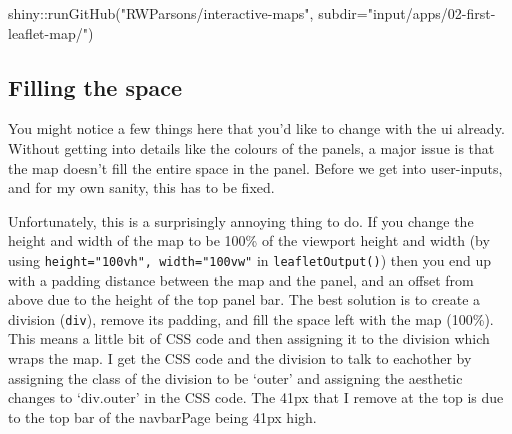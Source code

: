 \documentclass[
]{book}
\newenvironment{Shaded}{\begin{snugshade}}{\end{snugshade}}
\newcommand{\AttributeTok}[1]{\textcolor[rgb]{0.77,0.63,0.00}{#1}}
\newcommand{\FunctionTok}[1]{\textcolor[rgb]{0.00,0.00,0.00}{#1}}
\newcommand{\NormalTok}[1]{#1}
\newcommand{\SpecialCharTok}[1]{\textcolor[rgb]{0.00,0.00,0.00}{#1}}
\newcommand{\StringTok}[1]{\textcolor[rgb]{0.31,0.60,0.02}{#1}}
\begin{document}
\begin{Shaded}
\begin{Highlighting}[]
\NormalTok{shiny}\SpecialCharTok{::}\FunctionTok{runGitHub}\NormalTok{(}\StringTok{"RWParsons/interactive{-}maps"}\NormalTok{, }\AttributeTok{subdir=}\StringTok{"input/apps/02{-}first{-}leaflet{-}map/"}\NormalTok{)}
\end{Highlighting}
\end{Shaded}

\hypertarget{filling-the-space}{%
\subsection{Filling the space}\label{filling-the-space}}

You might notice a few things here that you'd like to change with the ui already. Without getting into details like the colours of the panels, a major issue is that the map doesn't fill the entire space in the panel. Before we get into user-inputs, and for my own sanity, this has to be fixed.

Unfortunately, this is a surprisingly annoying thing to do. If you change the height and width of the map to be 100\% of the viewport height and width (by using \texttt{height="100vh",\ width="100vw"} in \texttt{leafletOutput()}) then you end up with a padding distance between the map and the panel, and an offset from above due to the height of the top panel bar. The best solution is to create a division (\texttt{div}), remove its padding, and fill the space left with the map (100\%). This means a little bit of CSS code and then assigning it to the division which wraps the map. I get the CSS code and the division to talk to eachother by assigning the class of the division to be `outer' and assigning the aesthetic changes to `div.outer' in the CSS code. The 41px that I remove at the top is due to the top bar of the navbarPage being 41px high.
\end{document}
